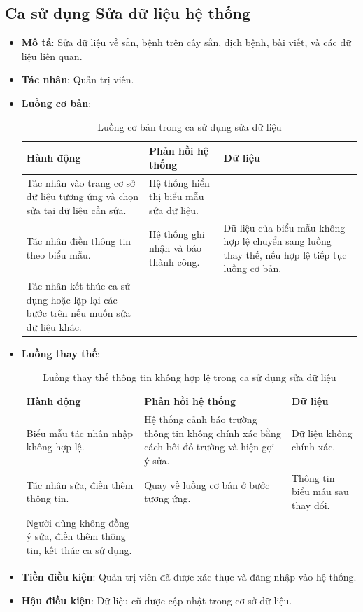 \documentclass[./../main.tex]{subfiles}
\begin{document}
\subsection{Ca sử dụng Sửa dữ liệu hệ thống}
\begin{itemize}
    \item \textbf{Mô tả}: Sửa dữ liệu về sắn, bệnh trên cây sắn, dịch bệnh, bài viết, và các dữ liệu liên quan.
    \item \textbf{Tác nhân}: Quản trị viên.
    \item \textbf{Luồng cơ bản}:
    \begin{table}[H]
    \caption{\label{uc-47}Luồng cơ bản trong ca sử dụng sửa dữ liệu}
    \begin{tabularx}{\textwidth}{| X | X | X |}
        \hline
        \textbf{Hành động} & \textbf{Phản hồi hệ thống} & \textbf{Dữ liệu} 
        \\ \hline
         Tác nhân vào trang cơ sở dữ liệu tương ứng và chọn sửa tại dữ liệu cần sửa. & Hệ thống hiển thị biểu mẫu sửa dữ liệu. & 
        \\ \hline
        Tác nhân điền thông tin theo biểu mẫu. & Hệ thống ghi nhận và báo thành công. & Dữ liệu của biểu mẫu không hợp lệ chuyển sang luồng thay thế, nếu hợp lệ tiếp tục luồng cơ bản.
        \\ \hline
        Tác nhân kết thúc ca sử dụng hoặc lặp lại các bước trên nếu muốn sửa dữ liệu khác. & &
        \\ \hline
    \end{tabularx}
    \end{table}    
    \item \textbf{Luồng thay thế}: 
        \begin{table}[H]
        \caption{\label{uc-48}Luồng thay thế thông tin không hợp lệ trong ca sử dụng sửa dữ liệu}
        \begin{tabularx}{\textwidth}{| X | X | X |}
            \hline
            \textbf{Hành động} & \textbf{Phản hồi hệ thống} & \textbf{Dữ liệu} \\ \hline
            Biểu mẫu tác nhân nhập không hợp lệ. & Hệ thống cảnh báo trường thông tin không chính xác bằng cách bôi đỏ trường và hiện gợi ý sửa. & Dữ liệu không chính xác.
            \\ \hline
            Tác nhân sửa, điền thêm thông tin. & Quay về luồng cơ bản ở bước tương ứng. & Thông tin biểu mẫu sau thay đổi.
            \\ \hline
            Người dùng không đồng ý sửa, điền thêm thông tin, kết thúc ca sử dụng. & & 
            \\ \hline
        \end{tabularx}
        \end{table}
    \item \textbf{Tiền điều kiện}: Quản trị viên đã được xác thực và đăng nhập vào hệ thống.
    \item \textbf{Hậu điều kiện}: Dữ liệu cũ được cập nhật trong cơ sở dữ liệu.
\end{itemize}
\end{document}
